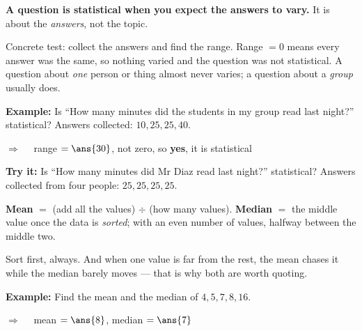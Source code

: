 \documentclass[12pt]{article}
\begin{document}


\begin{formulabox}
\textbf{A question is statistical when you expect the answers to vary.} It is about the
\emph{answers}, not the topic.\par
\smallskip
Concrete test: collect the answers and find the range. Range $= 0$ means every answer was
the same, so nothing varied and the question was not statistical. A question about
\emph{one} person or thing almost never varies; a question about a \emph{group} usually
does.
\end{formulabox}

\begin{examplebox}
\textbf{Example:} \quad Is ``How many minutes did the students in my group read last
night?'' statistical? Answers collected: $10, 25, 25, 40$.

$\Rightarrow\quad$ range $= \ans{30}$, not zero, so \textbf{yes}, it is statistical
\end{examplebox}

\begin{tryitbox}
\textbf{Try it:} \quad Is ``How many minutes did Mr Diaz read last night?'' statistical?
Answers collected from four people: $25, 25, 25, 25$.\\[2pt]
\end{tryitbox}


\begin{formulabox}
\textbf{Mean} $=$ (add all the values) $\div$ (how many values). \quad
\textbf{Median} $=$ the middle value once the data is \emph{sorted}; with an even number of
values, halfway between the middle two.\par
\smallskip
Sort first, always. And when one value is far from the rest, the mean chases it while the
median barely moves --- that is why both are worth quoting.
\end{formulabox}

\begin{examplebox}
\textbf{Example:} \quad Find the mean and the median of $4, 5, 7, 8, 16$.

$\Rightarrow\quad$ mean $= \ans{8}$, \quad median $= \ans{7}$
\end{examplebox}
\end{document}
